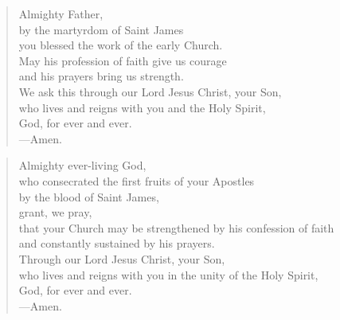 \prayer

\setlength{\vleftmargin}{\prayerleftmargini}

\begin{verse}
Almighty Father,\\
by the martyrdom of Saint James\\
you blessed the work of the early Church.\\
May his profession of faith give us courage\\
and his prayers bring us strength.\\
We ask this through our Lord Jesus Christ, your Son,\\
who lives and reigns with you and the Holy Spirit,\\
God, for ever and ever.\\
{\color{red}---\thinspace}Amen.
\end{verse}


\begin{verse}
Almighty ever-living God,\\
who consecrated the first fruits of your Apostles\\
by the blood of Saint James,\\
grant, we pray,\\
that your Church may be strengthened by his confession of faith\\
and constantly sustained by his prayers.\\
Through our Lord Jesus Christ, your Son,\\
who lives and reigns with you in the unity of the Holy Spirit,\\
God, for ever and ever.\\
{\color{red}---\thinspace}Amen.
\end{verse}

\setlength{\vleftmargin}{\defleftmargini}